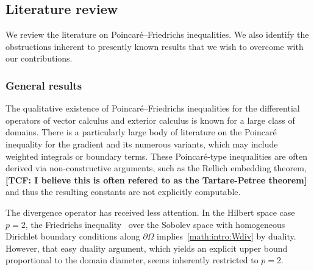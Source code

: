 \documentclass[10pt,a4paper]{article}
\newcommand{\todo}[1]{{\color{RedOrange}\textbf{#1}}}
\begin{document}
\subsection{Literature review}


We review the literature on Poincar\'e--Friedrichs inequalities. We also identify the obstructions inherent to presently known results that we wish to overcome with our contributions. 

\subsubsection{General results}

The qualitative existence of Poincar\'e--Friedrichs inequalities for the differential operators of vector calculus and exterior calculus is known for a large class of domains. 
There is a particularly large body of literature on the Poincar\'e inequality for the gradient and its numerous variants,
which may include weighted integrals or boundary terms. 
These Poincar\'e-type inequalities are often derived via non-constructive arguments, such as the Rellich embedding theorem, \todo{[TCF: I believe this is often refered to as the Tartare-Petree theorem]}
and thus the resulting constants are not explicitly computable. 

The divergence operator has received less attention. 
In the Hilbert space case $p=2$, the Friedrichs inequality~\cite{burenkov1998sobolev} over the Sobolev space
with homogeneous Dirichlet boundary conditions along $\partial \Omega$ implies~\eqref{math:intro:Wdiv} by duality. 
However, that easy duality argument, which yields an explicit upper bound proportional to the domain diameter, seems inherently restricted to $p=2$. 

\end{document}
